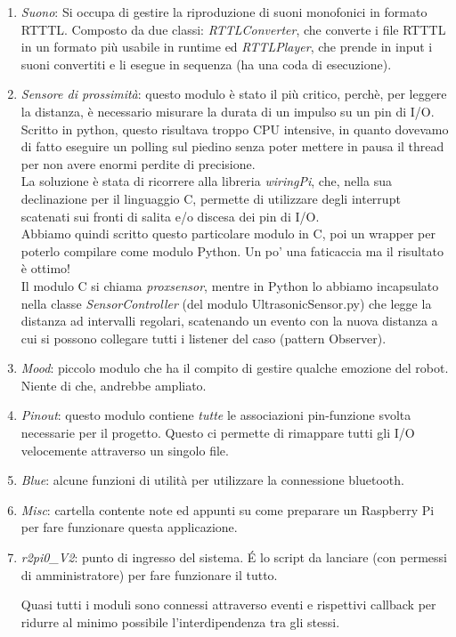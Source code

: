 \documentclass[12pt]{article}
\newcommand{\raspi}{Raspberry Pi}
\begin{document}
\begin{enumerate}
\item \emph{Suono}: Si occupa di gestire la riproduzione di suoni monofonici in formato RTTTL. Composto da due classi: \emph{RTTLConverter}, che converte i file RTTTL in un formato più usabile in runtime ed \emph{RTTLPlayer}, che prende in input i suoni convertiti e li esegue in sequenza (ha una coda di esecuzione).
\item \emph{Sensore di prossimità}: questo modulo è stato il più critico, perchè, per leggere la distanza, è necessario misurare la durata di un impulso su un pin di I/O. Scritto in python, questo risultava troppo CPU intensive, in quanto dovevamo di fatto eseguire un polling sul piedino senza poter mettere in pausa il thread per non avere enormi perdite di precisione.\\
La soluzione è stata di ricorrere alla libreria \emph{wiringPi}, che, nella sua declinazione per il linguaggio C, permette di utilizzare degli interrupt scatenati sui fronti di salita e/o discesa dei pin di I/O.\\
Abbiamo quindi scritto questo particolare modulo in C, poi un wrapper per poterlo compilare come modulo Python. Un po' una faticaccia ma il risultato è ottimo!\\
Il modulo C si chiama \emph{proxsensor}, mentre in Python lo abbiamo incapsulato nella classe \emph{SensorController} (del modulo UltrasonicSensor.py) che legge la distanza ad intervalli regolari, scatenando un evento con la nuova distanza a cui si possono collegare tutti i listener del caso (pattern Observer).
\item \emph{Mood}: piccolo modulo che ha il compito di gestire qualche emozione del robot. Niente di che, andrebbe ampliato.
\item \emph{Pinout}: questo modulo contiene \emph{tutte} le associazioni pin-funzione svolta necessarie per il progetto. Questo ci permette di rimappare tutti gli I/O velocemente attraverso un singolo file.
\item \emph{Blue}: alcune funzioni di utilità per utilizzare la connessione bluetooth.
\item \emph{Misc}: cartella contente note ed appunti su come preparare un \raspi{} per fare funzionare questa applicazione.
\item \emph{r2pi0\_{}V2}: punto di ingresso del sistema. \'E lo script da lanciare (con permessi di amministratore) per fare funzionare il tutto.

Quasi tutti i moduli sono connessi attraverso eventi e rispettivi callback per ridurre al minimo possibile l'interdipendenza tra gli stessi.
\end{enumerate}
\end{document}

